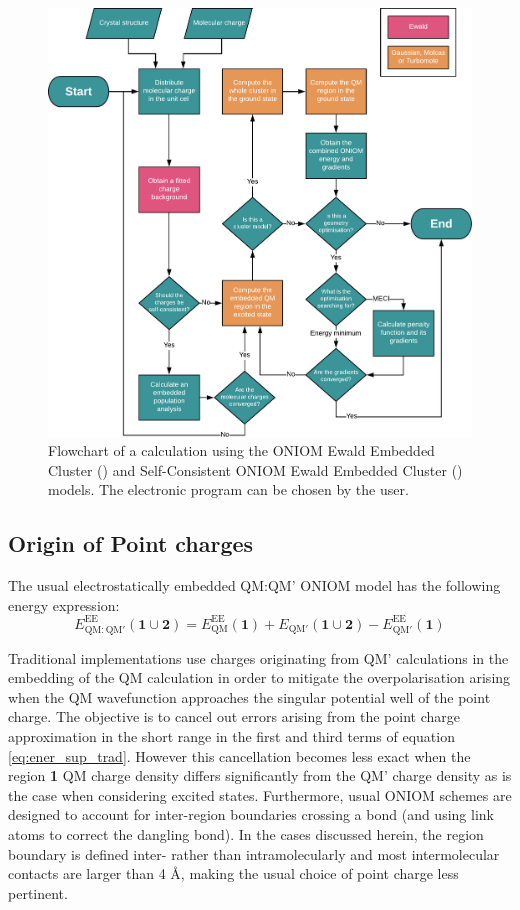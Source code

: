 \begin{figure}
\centering
\includegraphics[width=14cm]{Chapters/5Ewald/sc_diagram2.pdf}
\caption{Flowchart of a calculation using the ONIOM Ewald Embedded Cluster (\EEC{}) and Self-Consistent ONIOM Ewald Embedded Cluster (\SCEEC{}) models. The electronic program can be chosen by the user.}
\label{fig:sc}
\end{figure}

\subsection{Origin of Point charges}
\label{sec:origin_charges}
The usual electrostatically embedded QM:QM' ONIOM model has the following energy expression:
\begin{equation}
E_{\text{QM}:\text{QM}'}^{\text{EE}}(\bm{1} \cup \bm{2}) = E_{\text{QM}}^{\text{EE}}(\bm{1}) + E_{\text{QM}'}(\bm{1} \cup \bm{2}) - E_{\text{QM}'}^{\text{EE}}(\bm{1})
\label{eq:ener_sup_trad}
\end{equation}


Traditional implementations use charges originating from QM' calculations in the embedding of the QM calculation in order to mitigate the overpolarisation arising when the QM wavefunction approaches the singular potential well of the point charge.\cite{Hratchian2008} The objective is to cancel out errors arising from the point charge approximation in the short range in the first and third terms of equation \ref{eq:ener_sup_trad}. However this cancellation becomes less exact when the region \textbf{1} QM charge density differs significantly from the QM' charge density as is the case when considering excited states. Furthermore, usual ONIOM schemes are designed to account for inter-region boundaries crossing a bond (and using link atoms to correct the dangling bond). In the cases discussed herein, the region boundary is defined inter- rather than intramolecularly and most intermolecular contacts are larger than 4 \r{A}, making the usual choice of point charge less pertinent.

